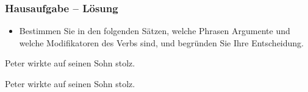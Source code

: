 \begin{frame}
\frametitle{Hausaufgabe -- Lösung} 

\begin{itemize}

\item Bestimmen Sie in den folgenden Sätzen, welche Phrasen Argumente und welche Modifikatoren des Verbs sind, und begründen Sie Ihre Entscheidung.

\end{itemize}

\settowidth \jamwidth{[Lesart 2]}

\ea Peter wirkte auf seinen Sohn stolz. \jambox{\alertgreen{[Lesart 1]}}

\pause 
{}



\pause 


\ex Peter wirkte auf seinen Sohn stolz. \jambox{\alertgreen{[Lesart 2]}}

\pause 
{}


\z 


\end{frame}